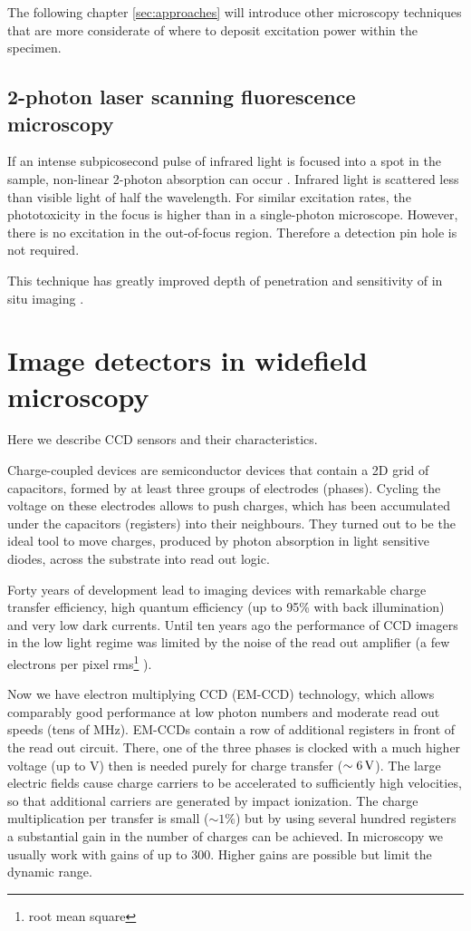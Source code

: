 The following chapter \ref{sec:approaches} will introduce other
microscopy techniques that are more considerate of where to deposit
excitation power within the specimen.
\subsection{2-photon laser scanning fluorescence microscopy}
If an intense subpicosecond pulse of infrared light is focused into a
spot in the sample, non-linear 2-photon absorption can occur
\citep{Denk1990}. Infrared light is scattered less than visible light
of half the wavelength. For similar excitation rates, the
phototoxicity in the focus is higher than in a single-photon
microscope. However, there is no excitation in the out-of-focus
region. Therefore a detection pin hole is not required.

This technique has greatly improved depth of penetration and
sensitivity of in situ imaging
\citep{Otsu2008}. %
\section{Image detectors in widefield microscopy}
\label{sec:ccd-intro}
\begin{summary}
  Here we describe CCD
  sensors and their characteristics.
\end{summary}
Charge-coupled devices are semiconductor devices that contain a 2D
grid of capacitors, formed by at least three groups of electrodes
(phases). Cycling the voltage on these electrodes allows to push
charges, which has been accumulated under the capacitors (registers)
into their neighbours. They turned out to be the ideal tool to move
charges, produced by photon absorption in light sensitive diodes,
across the substrate into read out logic.

Forty years of development lead to imaging devices with remarkable
charge transfer efficiency, high quantum efficiency (up to 95\% with
back illumination) and very low dark currents. Until ten years ago the
performance of CCD imagers in the low light regime was limited by the
noise of the read out amplifier (a few electrons per pixel
rms\footnote{root mean square} ).

Now we have electron multiplying CCD (EM-CCD)
 technology,
which allows comparably good performance at low photon numbers
\citep{Mackay,Robbins2003} and moderate read out speeds (tens of
MHz). EM-CCDs contain a row of additional registers in front of the
read out circuit. There, one of the three phases is clocked with a
much higher voltage (up to \unit[40]{V}) then is needed purely for
charge transfer ($\unit[\sim6]{V}$). The large electric fields cause
charge carriers to be accelerated to sufficiently high velocities, so
that additional carriers are generated by impact ionization. The
charge multiplication per transfer is small ($\sim1\%$) but by using
several hundred registers a substantial gain in the number of charges
can be achieved. In microscopy we usually work with gains of up to
300. Higher gains are possible but limit the dynamic range.

